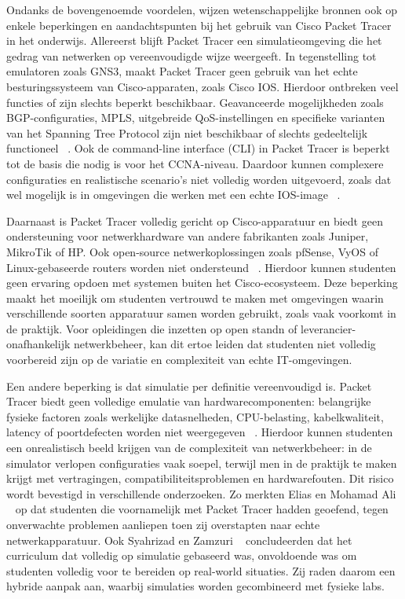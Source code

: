 Ondanks de bovengenoemde voordelen, wijzen wetenschappelijke bronnen ook op enkele beperkingen en aandachtspunten bij het gebruik van Cisco Packet Tracer in het onderwijs. Allereerst blijft Packet Tracer een simulatieomgeving die het gedrag van netwerken op vereenvoudigde wijze weergeeft. In tegenstelling tot emulatoren zoals GNS3, maakt Packet Tracer geen gebruik van het echte besturingssysteem van Cisco-apparaten, zoals Cisco IOS. Hierdoor ontbreken veel functies of zijn slechts beperkt beschikbaar. Geavanceerde mogelijkheden zoals BGP-configuraties, MPLS, uitgebreide QoS-instellingen en specifieke varianten van het Spanning Tree Protocol zijn niet beschikbaar of slechts gedeeltelijk functioneel ~\autocite{Kuzmenko2016}. Ook de command-line interface (CLI) in Packet Tracer is beperkt tot de basis die nodig is voor het CCNA-niveau. Daardoor kunnen complexere configuraties en realistische scenario’s niet volledig worden uitgevoerd, zoals dat wel mogelijk is in omgevingen die werken met een echte IOS-image ~\autocite{Mwansa2024}.

\vspace{0.3cm}

Daarnaast is Packet Tracer volledig gericht op Cisco-apparatuur en biedt geen ondersteuning voor netwerkhardware van andere fabrikanten zoals Juniper, MikroTik of HP. Ook open-source netwerkoplossingen zoals pfSense, VyOS of Linux-gebaseerde routers worden niet ondersteund ~\autocite{Kuzmenko2016}. Hierdoor kunnen studenten geen ervaring opdoen met systemen buiten het Cisco-ecosysteem. Deze beperking maakt het moeilijk om studenten vertrouwd te maken met omgevingen waarin verschillende soorten apparatuur samen worden gebruikt, zoals vaak voorkomt in de praktijk. Voor opleidingen die inzetten op open standn of leverancier-onafhankelijk netwerkbeheer, kan dit ertoe leiden dat studenten niet volledig voorbereid zijn op de variatie en complexiteit van echte IT-omgevingen.

\vspace{0.3cm}

Een andere beperking is dat simulatie per definitie vereenvoudigd is. Packet Tracer biedt geen volledige emulatie van hardwarecomponenten: belangrijke fysieke factoren zoals werkelijke datasnelheden, CPU-belasting, kabelkwaliteit, latency of poortdefecten worden niet weergegeven ~\autocite{Hashimi2017}. Hierdoor kunnen studenten een onrealistisch beeld krijgen van de complexiteit van netwerkbeheer: in de simulator verlopen configuraties vaak soepel, terwijl men in de praktijk te maken krijgt met vertragingen, compatibiliteitsproblemen en hardwarefouten. Dit risico wordt bevestigd in verschillende onderzoeken. Zo merkten Elias en Mohamad Ali ~\autocite{Elias2014} op dat studenten die voornamelijk met Packet Tracer hadden geoefend, tegen onverwachte problemen aanliepen toen zij overstapten naar echte netwerkapparatuur. Ook Syahrizad en Zamzuri ~\autocite{Elias2014} concludeerden dat het curriculum dat volledig op simulatie gebaseerd was, onvoldoende was om studenten volledig voor te bereiden op real-world situaties. Zij raden daarom een hybride aanpak aan, waarbij simulaties worden gecombineerd met fysieke labs.

